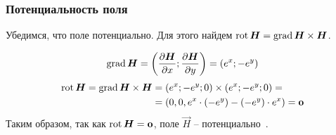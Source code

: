 \begin{frame}\frametitle{Потенциальность поля}
	Убедимся, что поле потенциально.
	Для этого найдем \( \rot \vec H = \grad \vec H \times \vec H \).

	\begin{equation*}
		\grad \vec H =
		\left( \frac{\partial \vec H}{\partial x};  \frac{\partial \vec H}{\partial y}\right) =
		\left( e^x; -e^{y} \right)
	\end{equation*}
	\begin{align*}
		\rot \vec H = \grad \vec H \times \vec H & = (e^x; -e^y; 0) \times (e^x; -e^y; 0) =               \\
		                                         & = (0, 0, e^x \cdot (-e^y) - (-e^y) \cdot e^x) = \vec 0
	\end{align*}
	Таким образом, так как \(\rot \vec H = \vec 0\), поле \(\vec H\) -- потенциально~\cite{korn}.

\end{frame}
